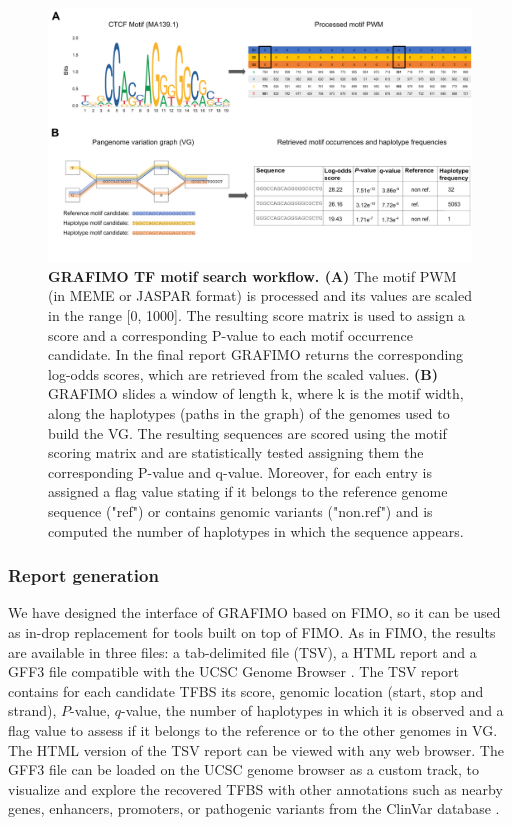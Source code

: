 \documentclass[a4paper, titlepage, openright]{book}
\newcommand{\grafimo}{GRAFIMO\xspace}
\begin{document}
\begin{figure}
	\centering
	\includegraphics[width=\textwidth]{figures/grafimo1.png}
	\caption[ GRAFIMO TF motif search workflow.]{\textbf{\grafimo TF motif search workflow. (A)} The motif PWM (in MEME or JASPAR format) is processed and its values are scaled in the range [0, 1000]. The resulting score matrix is used to assign a score and a corresponding P-value to each motif occurrence candidate. In the final report \grafimo returns the corresponding log-odds scores, which are retrieved from the scaled values. \textbf{(B)} \grafimo slides a window of length k, where k is the motif width, along the haplotypes (paths in the graph) of the genomes used to build the VG. The resulting sequences are scored using the motif scoring matrix and are statistically tested assigning them the corresponding P-value and q-value. Moreover, for each entry is assigned a flag value stating if it belongs to the reference genome sequence ("ref") or contains genomic variants ("non.ref") and is computed the number of haplotypes in which the sequence appears.}
	\label{fig:grafimo1}
\end{figure} 
\subsubsection{Report generation}
We have designed the interface of GRAFIMO based on FIMO, so it can be used as in-drop replacement for tools built on top of FIMO. As in FIMO, the results are available in three files: a tab-delimited file (TSV), a HTML report and a GFF3 file compatible with the UCSC Genome Browser \citep{lee2020ucsc}. The TSV report contains for each candidate TFBS its score, genomic location (start, stop and strand), $P$-value, $q$-value, the number of haplotypes in which it is observed and a flag value to assess if it belongs to the reference or to the other genomes in VG. The HTML version of the TSV report can be viewed with any web browser. The GFF3 file  can be loaded on the UCSC genome browser as a custom track, to visualize and explore the recovered TFBS with other annotations such as nearby genes, enhancers, promoters, or pathogenic variants from the ClinVar database \citep{landrum2020clinvar}.
\end{document}

